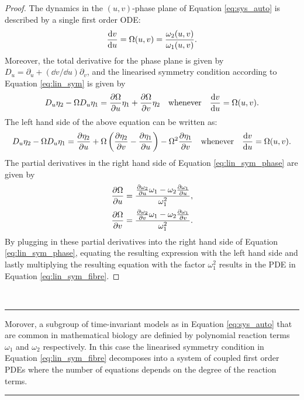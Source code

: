   \dotfill
\begin{proof}
  The dynamics in the $(u,v)$-phase plane of Equation \eqref{eq:sys_auto} is described by a single first order ODE:
\begin{equation}
\dv{v}{u}=\Omega(u,v)=\dfrac{\omega_2(u,v)}{\omega_1(u,v)}.
  \label{eq:sys_phase}
\end{equation}
Moreover, the total derivative for the phase plane is given by $D_u=\partial_u+(\dd v/\dd u)\partial_v$, and the linearised symmetry condition according to Equation \eqref{eq:lin_sym} is given by
\begin{equation}
  D_u\eta_2-\Omega D_u\eta_1=\pdv{\Omega}{u}\eta_1+\pdv{\Omega}{v}\eta_2\quad\textrm{whenever}\quad\dv{v}{u}=\Omega(u,v).
  \label{eq:lin_sym_phase}
  \end{equation}
The left hand side of the above equation can be written as:
\begin{equation*}
  D_u\eta_2-\Omega D_u\eta_1=\pdv{\eta_2}{u}+\Omega\left(\pdv{\eta_2}{v}-\pdv{\eta_1}{u}\right)-\Omega^2\pdv{\eta_1}{v}\quad\textrm{whenever}\quad\dv{v}{u}=\Omega(u,v).
\end{equation*}
The partial derivatives in the right hand side of Equation \eqref{eq:lin_sym_phase} are given by
\begin{align*}
  \pdv{\Omega}{u}&=\dfrac{\pdv{\omega_2}{u}\omega_1-\omega_2\pdv{\omega_1}{u}}{\omega_1^{2}},\\
  \pdv{\Omega}{v}&=\dfrac{\pdv{\omega_2}{v}\omega_1-\omega_2\pdv{\omega_1}{v}}{\omega_1^{2}}.
\end{align*}
By plugging in these partial derivatives into the right hand side of Equation \eqref{eq:lin_sym_phase}, equating the resulting expression with the left hand side and lastly multiplying the resulting equation with the factor $\omega_1^{2}$ results in the PDE in Equation \eqref{eq:lin_sym_fibre}. 
\end{proof}
\dotfill\\
\hrule
$\;$\\Morover, a subgroup of time-invariant models as in Equation \eqref{eq:sys_auto} that are common in mathematical biology are definied by polynomial reaction terms $\omega_1$ and $\omega_2$ respectively. In this case the linearised symmetry condition in Equation \eqref{eq:lin_sym_fibre} decomposes into a system of coupled first order PDEs where the number of equations depends on the degree of the reaction terms.\\
\hrule
